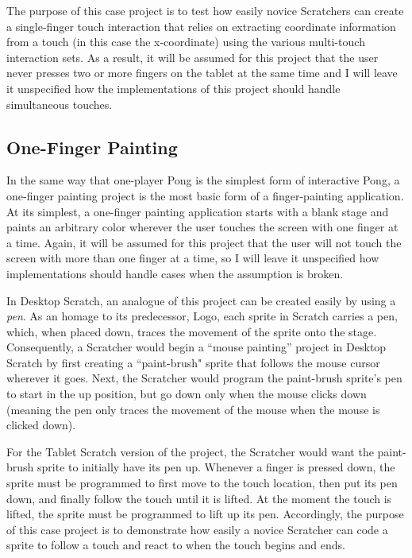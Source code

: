 The purpose of this case project is to test how easily novice Scratchers can create a single-finger touch interaction that relies on extracting coordinate information from a touch (in this case the x-coordinate) using the various multi-touch interaction sets. As a result, it will be assumed for this project that the user never presses two or more fingers on the tablet at the same time and I will leave it unspecified how the implementations of this project should handle simultaneous touches.

\subsection{One-Finger Painting}
In the same way that one-player Pong is the simplest form of interactive Pong, a one-finger painting project is the most basic form of a finger-painting application. At its simplest, a one-finger painting application starts with a blank stage and paints an arbitrary color wherever the user touches the screen with one finger at a time. Again, it will be assumed for this project that the user will not touch the screen with more than one finger at a time, so I will leave it unspecified how implementations should handle cases when the assumption is broken.

In Desktop Scratch, an analogue of this project can be created easily by using a \emph{pen}. As an homage to its predecessor, Logo, each sprite in Scratch carries a pen, which, when placed down, traces the movement of the sprite onto the stage. Consequently, a Scratcher would begin a ``mouse painting'' project in Desktop Scratch by first creating a ``paint-brush" sprite that follows the mouse cursor wherever it goes. Next, the Scratcher would program the paint-brush sprite's pen to start in the up position, but go down only when the mouse clicks down (meaning the pen only traces the movement of the mouse when the mouse is clicked down).

For the Tablet Scratch version of the project, the Scratcher would want the paint-brush sprite to initially have its pen up. Whenever a finger is pressed down, the sprite must be programmed to first move to the touch location, then put its pen down, and finally follow the touch until it is lifted. At the moment the touch is lifted, the sprite must be programmed to lift up its pen. Accordingly, the purpose of this case project is to demonstrate how easily a novice Scratcher can code a sprite to follow a touch and react to when the touch begins and ends.
 
